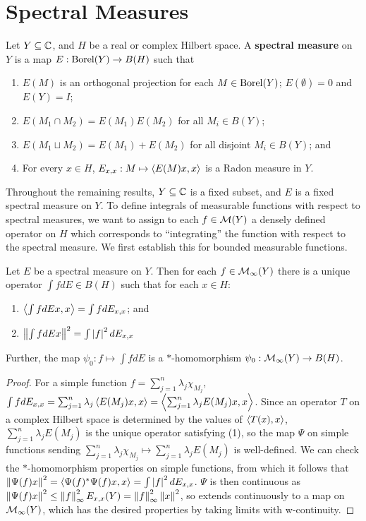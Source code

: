 \documentclass[10pt]{amsart}
\begin{document}
\section{Spectral Measures}
\begin{definition}
    Let $Y \subseteq \mathbb{C}$, and $H$ be a real or complex Hilbert space. A \textbf{spectral measure} on $Y$ is a map $E : \operatorname{Borel}(Y) \to B(H)$ such that
    \begin{enumerate}
        \item $E(M)$ is an orthogonal projection for each $M \in \operatorname{Borel}(Y)$; $E(\emptyset) = 0$ and $E(Y) = I$;
        \item $E(M_1 \cap M_2) = E(M_1)E(M_2)$ for all $M_i \in B(Y)$;
        \item $E(M_1 \sqcup M_2) = E(M_1) + E(M_2)$ for all disjoint $M_i \in B(Y)$; and
        \item For every $x \in H$, $E_{x, x} : M \mapsto \left\langle E(M)x, x \right\rangle$ is a Radon measure in $Y$.
    \end{enumerate}
\end{definition}
Throughout the remaining results, $Y \subseteq \mathbb{C}$ is a fixed subset, and $E$ is a fixed spectral measure on $Y$. To define integrals of measurable functions with respect to spectral measures, we want to assign to each $f \in \mathcal{M}(Y)$ a densely defined operator on $H$ which corresponds to ``integrating'' the function with respect to the spectral measure. We first establish this for bounded measurable functions.
\begin{lemma}\label{bdint}
    Let $E$ be a spectral measure on $Y$. Then for each $f \in \mathcal{M}_\infty(Y)$ there is a unique operator $\int f dE \in B(H)$ such that for each $x \in H$:
    \begin{enumerate}
        \item $\left\langle \int f dEx, x \right\rangle = \int f dE_{x, x}$; and
        \item $\left\| \int f dE x \right\|^2 = \int\left| f \right|^2 dE_{x, x}$
    \end{enumerate}
    Further, the map $\psi_0 : f \mapsto \int f dE$ is a $*$-homomorphism $\psi_0 : \mathcal{M}_\infty(Y) \to B(H)$.
\end{lemma}
\begin{proof}
    For a simple function $f = \sum_{j = 1}^n \lambda_j \chi_{M_j}$, $\int f dE_{x, x} = \sum_{j = 1}^n\lambda_j\left\langle E(M_j)x, x \right\rangle = \left\langle \sum_{j = 1}^n \lambda_j E(M_j)x, x \right\rangle$. Since an operator $T$ on a complex Hilbert space is determined by the values of $\left\langle T(x), x \right\rangle$, $\sum_{j = 1}^n \lambda_j E(M_j)$ is the unique operator satisfying (1), so the map $\Psi$ on simple functions sending $\sum_{j = 1}^n \lambda_j \chi_{M_j} \mapsto \sum_{j = 1}^n \lambda_j E(M_j)$ is well-defined. We can check the $*$-homomorphism properties on simple functions, from which it follows that $\left\| \Psi(f)x \right\|^2 = \left\langle \Psi(f)^*\Psi(f)x, x \right\rangle = \int \left| f \right|^2 dE_{x, x}$. $\Psi$ is then continuous as $\left\| \Psi(f)x \right\|^2 \leq \left\| f \right\|^2_\infty E_{x, x}(Y) = \left\| f \right\|_\infty^2\left\| x \right\|^2$, so extends continuously to a map on $\mathcal{M}_\infty(Y)$, which has the desired properties by taking limits with w-continuity.
\end{proof}
\end{document}
